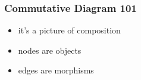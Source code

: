 \documentclass[include/preamble.tex]{subfiles}
\begin{document}
{

  \begin{frame}
    \frametitle{Commutative Diagram 101}
    \begin{itemize}
    \item it's a picture of composition
    \item nodes are objects
    \item edges are morphisms
    \end{itemize}
  \end{frame}

  
}






\end{document}
